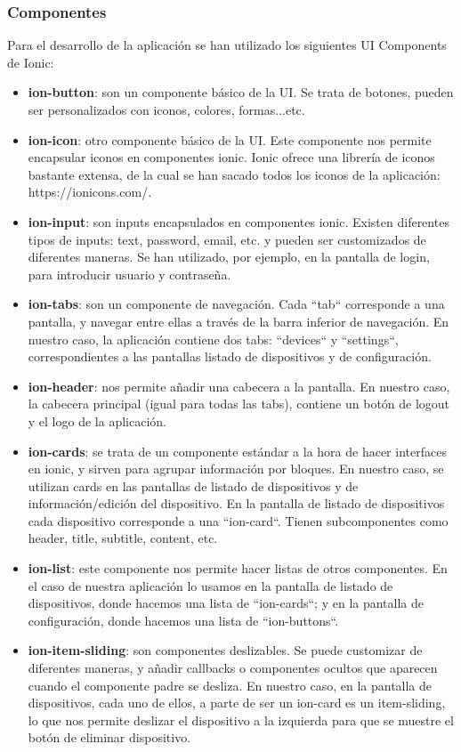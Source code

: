 \subsubsection{Componentes}
Para el desarrollo de la aplicación se han utilizado los siguientes UI Components de Ionic:
\begin{itemize}
\item\textbf{ion-button}: son un componente básico de la UI. Se trata de botones, pueden ser personalizados con iconos, colores, formas...etc.
\item\textbf{ion-icon}: otro componente básico de la UI. Este componente nos permite encapsular iconos en componentes ionic. Ionic ofrece una librería de
iconos bastante extensa, de la cual se han sacado todos los iconos de la aplicación: https://ionicons.com/.
\item\textbf{ion-input}: son inputs encapsulados en componentes ionic. Existen diferentes tipos de inputs: text, password, email, etc. y pueden ser customizados
de diferentes maneras. Se han utilizado, por ejemplo, en la pantalla de login, para introducir usuario y contraseña.
\item\textbf{ion-tabs}: son un componente de navegación. Cada ``tab`` corresponde a una pantalla, y navegar entre ellas a través de la barra inferior de
navegación. En nuestro caso, la aplicación contiene dos tabs: ``devices`` y ``settings``, correspondientes a las pantallas listado de dispositivos y
de configuración.
\item\textbf{ion-header}: nos permite añadir una cabecera a la pantalla. En nuestro caso, la cabecera principal (igual para todas las tabs), contiene un botón
de logout y el logo de la aplicación.
\item\textbf{ion-cards}: se trata de un componente estándar a la hora de hacer interfaces en ionic, y sirven para agrupar información por bloques. En nuestro caso,
 se utilizan cards en las pantallas de listado de dispositivos y de información/edición del dispositivo. En la pantalla de listado de dispositivos
 cada dispositivo corresponde a una ``ion-card``. Tienen subcomponentes como header, title, subtitle, content, etc.
\item\textbf{ion-list}: este componente nos permite hacer listas de otros componentes. En el caso de nuestra aplicación lo usamos en la pantalla de listado
de dispositivos, donde hacemos una lista de ``ion-cards``; y en la pantalla de configuración, donde hacemos una lista de ``ion-buttons``.
\item\textbf{ion-item-sliding}: son componentes deslizables. Se puede customizar de diferentes maneras, y añadir callbacks o componentes ocultos que aparecen
cuando el componente padre se desliza. En nuestro caso, en la pantalla de dispositivos, cada uno de ellos, a parte de ser un ion-card es un item-sliding, lo que
nos permite deslizar el dispositivo a la izquierda para que se muestre el botón de eliminar dispositivo.
\end{itemize}
